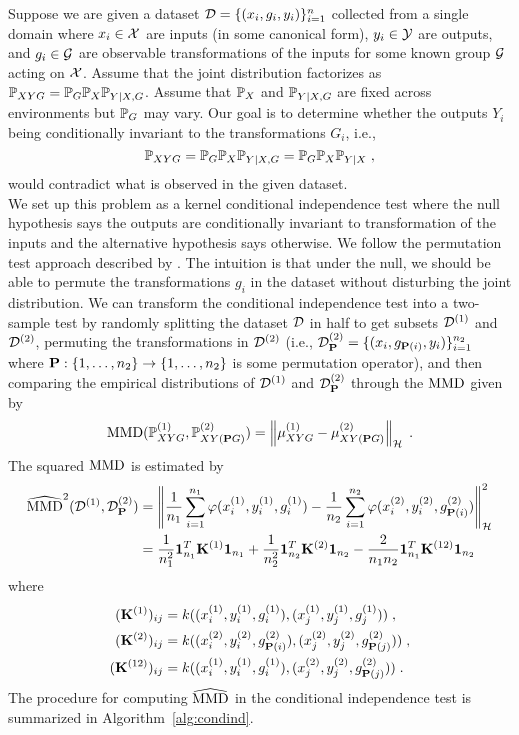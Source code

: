 Suppose we are given a dataset $\calD=\{(x_i,g_i,y_i)\}_{i=1}^n$ collected from a single domain where $x_i\in\calX$ are inputs (in some canonical form), $y_i\in\calY$ are outputs, and $g_i\in\calG$ are observable transformations of the inputs for some known group $\calG$ acting on $\calX$. Assume that the joint distribution factorizes as $\P_{XYG}=\P_G\P_X\P_{Y|X,G}$. Assume that $\bbP_X$ and $\bbP_{Y|X,G}$ are fixed across environments but $\bbP_G$ may vary. Our goal is to determine whether the outputs $Y_i$ being conditionally invariant to the transformations $G_i$, i.e.,
\[
\P_{XYG}=\P_G\P_X\P_{Y|X,G} = \P_G\P_X\P_{Y|X}\;,
\]
would contradict what is observed in the given dataset.
\\

We set up this problem as a kernel conditional independence test where the null hypothesis says the outputs are conditionally invariant to transformation of the inputs and the alternative hypothesis says otherwise. We follow the permutation test approach described by \textcite{Doran:2014}. The intuition is that under the null, we should be able to permute the transformations $g_i$ in the dataset without disturbing the joint distribution. We can transform the conditional independence test into a two-sample test by randomly splitting the dataset $\calD$ in half to get subsets $\calD^{(1)}$ and $\calD^{(2)}$, permuting the transformations in $\calD^{(2)}$ (i.e., $\calD_\bfP^{(2)}=\{(x_i,g_{\bfP(i)},y_i)\}_{i=1}^{n_2}$ where $\bfP:\{1,\ldots,n_2\}\rightarrow\{1,\ldots,n_2\}$ is some permutation operator), and then comparing the empirical distributions of $\calD^{(1)}$ and $\calD_\bfP^{(2)}$ through the $\MMD$ given by
\[
\MMD(\P_{XYG}^{(1)},\P_{XY(\bfP G)}^{(2)}) = \left\|\mu_{XYG}^{(1)}-\mu_{XY(\bfP G)}^{(2)}\right\|_\calH \;.
\]
The squared $\MMD$ is estimated by
\begin{align*}
\hatMMD^2(\calD^{(1)},\calD_\bfP^{(2)}) &= \left\|\frac{1}{n_1}\sum_{i=1}^{n_1}\varphi(\xo_i,\yo_i,\go_i) - \frac{1}{n_2}\sum_{i=1}^{n_2}\varphi(\xt_i,\yt_i,\gtw_{\bfP(i)})\right\|_\calH^2 \\
&= \frac{1}{n_1^2}\onevec_{n_1}^T\bfK^{(1)}\onevec_{n_1} + \frac{1}{n_2^2}\onevec_{n_2}^T\bfK^{(2)}\onevec_{n_2} - \frac{2}{n_1n_2}\onevec_{n_1}^T\bfK^{(12)}\onevec_{n_2}
\end{align*}
where
\begin{align*}
(\bfK^{(1)})_{ij} &= k((\xo_i,\yo_i,\go_i),(\xo_j,\yo_j,\go_j)) \;, \\
(\bfK^{(2)})_{ij} &= k((\xt_i,\yt_i,\gtw_{\bfP(i)}),(\xt_j,\yt_j,\gtw_{\bfP(j)})) \;, \\
(\bfK^{(12)})_{ij} &= k((\xo_i,\yo_i,\go_i),(\xt_j,\yt_j,\gtw_{\bfP(j)})) \;.
\end{align*}
The procedure for computing $\hatMMD$ in the conditional independence test is summarized in Algorithm~\ref{alg:condind}.
\\

